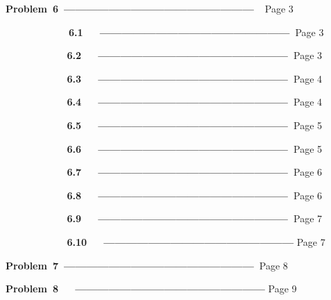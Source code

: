 \documentclass[12pt]{article}
\begin{document}
\setlength{\parskip}{0.0pt}
\textbf{Problem\ 6\   ---------------------------------------------------\ \  }Page 3\par

\ \ \ \ \ \ \ \ \ \  \ \ \    \textbf{6.1\ \ \ ---------------------------------------------------\   }Page 3{\fontsize{13pt}{15.6pt}\selectfont \textbf{ }\par}\par

\setlength{\parskip}{2.04pt}
{\fontsize{13pt}{15.6pt}\selectfont \textbf{\ \ \ \ \ \ \ \ \ \ \  6.2\ \ \ ---------------------------------------------------\   }Page 3\par}\par

\textbf{\ \ \ \ \ \ \ \ \ \      \  6.3\ \ \ ---------------------------------------------------\   }Page 4\par

\textbf{\ \ \ \ \ \ \ \ \ \ \  6.4\ \ \ ---------------------------------------------------\   }Page 4\par

\textbf{\ \ \ \ \ \ \ \ \ \ \  6.5\ \ \ ---------------------------------------------------\   }Page 5\par

\textbf{\ \ \ \ \ \ \ \ \ \ \  6.6\ \ \ ---------------------------------------------------\   }Page 5\par

\textbf{\ \ \ \ \ \ \ \ \ \ \  6.7\ \ \ ---------------------------------------------------\   }Page 6\par

\textbf{\ \ \ \ \ \ \ \ \ \ \  6.8\ \ \ ---------------------------------------------------\   }Page 6\par

\textbf{\ \ \ \ \ \ \ \ \ \ \  6.9\ \ \ ---------------------------------------------------\   }Page 7\par

\textbf{\ \ \ \ \ \ \ \ \ \ \ 6.10\ \ \ ---------------------------------------------------   }Page 7\par


\vspace{\baselineskip}
\textbf{ Problem\ 7\   ---------------------------------------------------\   }Page 8\par


\vspace{\baselineskip}
 \textbf{Problem\ 8\ \ \ ---------------------------------------------------   }Page 9\par
\end{document}
